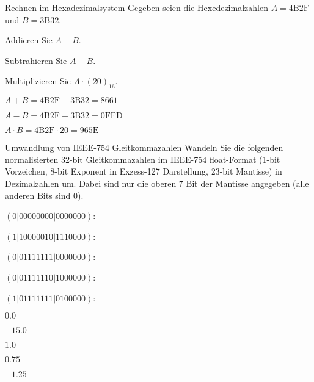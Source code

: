 \documentclass{exercisesheet}
\begin{document}
\begin{eexercises}{Rechnen im Hexadezimalsystem}
  {Gegeben seien die Hexedezimalzahlen $A = \mathrm{4B2F}$ und $B = \mathrm{3B32}$.}
  \item Addieren Sie $A+B$.
  \item Subtrahieren Sie $A-B$.
  \item Multiplizieren Sie $A\cdot (20)_{16}$.
\end{eexercises}

\begin{solutions}
  \item $A + B = \mathrm{4B2F} + \mathrm{3B32} = \mathrm{8661}$
  \item $A - B = \mathrm{4B2F} - \mathrm{3B32} = \mathrm{0FFD}$
  \item $A \cdot B = \mathrm{4B2F} \cdot 20 = \mathrm{965E}$
\end{solutions}

\begin{eexercises}{Umwandlung von IEEE-754 Gleitkommazahlen}{
    Wandeln Sie die folgenden normalisierten 32-bit Gleitkommazahlen im IEEE-754 float-Format (1-bit Vorzeichen, 8-bit Exponent in Exzess-127 Darstellung, 23-bit Mantisse) in Dezimalzahlen um. Dabei sind nur die oberen 7 Bit der Mantisse angegeben (alle anderen Bits sind 0).
  }
  \item $(0|0000 0000|0000 000)$:
  \item $(1|1000 0010|1110 000)$:
  \item $(0|0111 1111|0000 000)$:
  \item $(0|0111 1110|1000 000)$:
  \item $(1|0111 1111|0100 000)$:
\end{eexercises}

\begin{solutions}
  \item $0.0$
  \item $-15.0$
  \item $1.0$
  \item $0.75$
  \item $-1.25$
\end{solutions}
\end{document}
